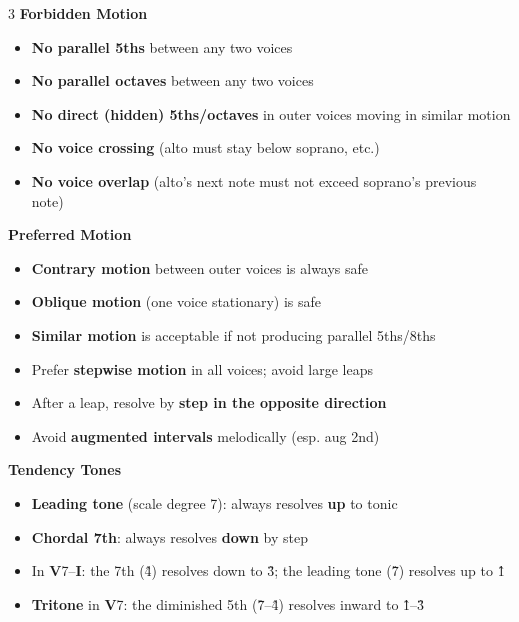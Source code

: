 \documentclass[letterpaper]{article}
\newcommand{\rn}[2]{\textbf{#1}#2}
\begin{document}
\begin{multicols}{3}
\vspace{4mm}
{\small\colorbox{headerbg}{\color{white}\textbf{\quad Forbidden Motion\quad}}}

\vspace{2mm}
{\small
\begin{itemize}
  \item \textbf{No parallel 5ths} between any two voices
  \item \textbf{No parallel octaves} between any two voices
  \item \textbf{No direct (hidden) 5ths/octaves} in outer voices moving in similar motion
  \item \textbf{No voice crossing} (alto must stay below soprano, etc.)
  \item \textbf{No voice overlap} (alto's next note must not exceed soprano's previous note)
\end{itemize}
}

\columnbreak

{\small\colorbox{headerbg}{\color{white}\textbf{\quad Preferred Motion\quad}}}

\vspace{2mm}
{\small
\begin{itemize}
  \item \textbf{Contrary motion} between outer voices is always safe
  \item \textbf{Oblique motion} (one voice stationary) is safe
  \item \textbf{Similar motion} is acceptable if not producing parallel 5ths/8ths
  \item Prefer \textbf{stepwise motion} in all voices; avoid large leaps
  \item After a leap, resolve by \textbf{step in the opposite direction}
  \item Avoid \textbf{augmented intervals} melodically (esp. aug 2nd)
\end{itemize}
}

\vspace{4mm}
{\small\colorbox{headerbg}{\color{white}\textbf{\quad Tendency Tones\quad}}}

\vspace{2mm}
{\small
\begin{itemize}
  \item \textbf{Leading tone} (scale degree 7): always resolves \textbf{up} to tonic
  \item \textbf{Chordal 7th}: always resolves \textbf{down} by step
  \item In \rn{V}{7}--\rn{I}{}: the 7th (4̂) resolves down to 3̂; the leading tone (7̂) resolves up to 1̂
  \item \textbf{Tritone} in \rn{V}{7}: the diminished 5th (7̂--4̂) resolves inward to 1̂--3̂
\end{itemize}
}


\end{multicols}
\end{document}
